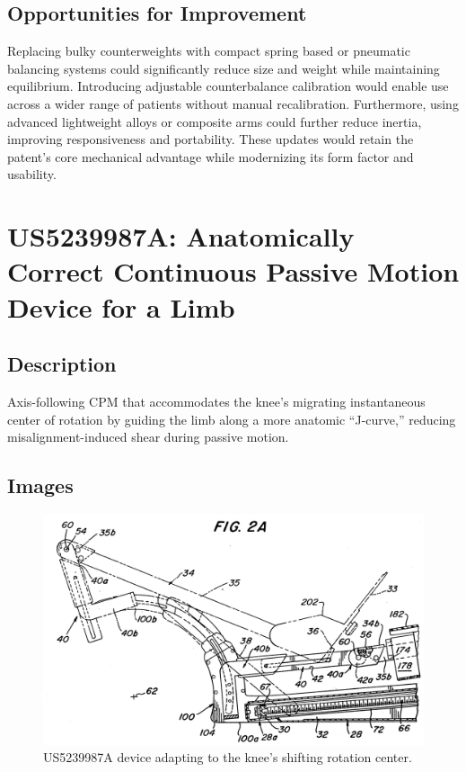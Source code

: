 \documentclass[11pt]{article}
\begin{document}
\subsection{Opportunities for Improvement}
Replacing bulky counterweights with compact spring based or pneumatic balancing systems could significantly reduce size and weight while maintaining equilibrium. Introducing adjustable counterbalance calibration would enable use across a wider range of patients without manual recalibration. Furthermore, using advanced lightweight alloys or composite arms could further reduce inertia, improving responsiveness and portability. These updates would retain the patent's core mechanical advantage while modernizing its form factor and usability.

\section{US5239987A: Anatomically Correct Continuous Passive Motion Device for a Limb}
\subsection{Description}
Axis-following CPM that accommodates the knee’s migrating instantaneous center of rotation by guiding the limb along a more anatomic “J-curve,” reducing misalignment-induced shear during passive motion.
\subsection{Images}
\begin{figure}[H]
  \centering
  \includegraphics[width=0.54\linewidth]{US5239987-drawings-page-3.png}
  \caption{US5239987A device adapting to the knee’s shifting rotation center.}
  \label{fig:US5239987A}
\end{figure}
\end{document}
